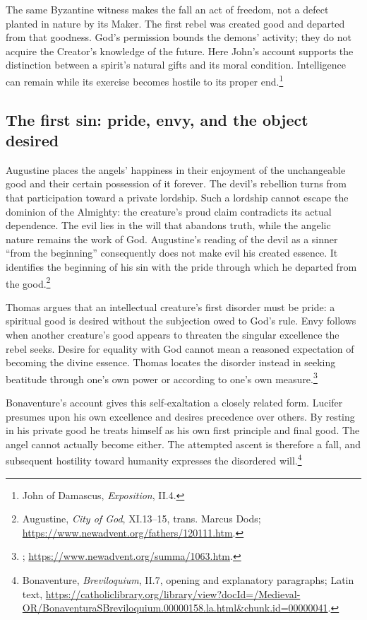 The same Byzantine witness makes the fall an act of freedom, not a defect
planted in nature by its Maker. The first rebel was created good and departed
from that goodness. God's permission bounds the demons' activity; they do
not acquire the Creator's knowledge of the future. Here John's account
supports the distinction between a spirit's natural gifts and its moral
condition. Intelligence can remain while its exercise becomes hostile to
its proper end.\footnote{John of Damascus, \emph{Exposition}, II.4.}

\subsection{The first sin: pride, envy, and the object desired}

Augustine places the angels' happiness in their enjoyment of the unchangeable
good and their certain possession of it forever. The devil's rebellion turns
from that participation toward a private lordship. Such a lordship cannot
escape the dominion of the Almighty: the creature's proud claim contradicts
its actual dependence. The evil lies in the will that abandons truth, while
the angelic nature remains the work of God. Augustine's reading of the devil
as a sinner ``from the beginning'' consequently does not make evil his
created essence. It identifies the beginning of his sin with the pride
through which he departed from the good.\footnote{Augustine, \emph{City of
God}, XI.13--15, trans. Marcus Dods;
\url{https://www.newadvent.org/fathers/120111.htm}.}

Thomas argues that an intellectual
creature's first disorder must be pride: a spiritual good is desired without
the subjection owed to God's rule. Envy follows when another creature's good
appears to threaten the singular excellence the rebel seeks. Desire for
equality with God cannot mean a reasoned expectation of becoming the divine
essence. Thomas locates the disorder instead in seeking beatitude through
one's own power or according to one's own measure.\footnote{; \url{https://www.newadvent.org/summa/1063.htm}.}

Bonaventure's account gives this self-exaltation a closely related form.
Lucifer presumes upon his own excellence and desires precedence over others.
By resting in his private good he treats himself as his own first principle
and final good. The angel cannot actually become either. The attempted
ascent is therefore a fall, and subsequent hostility toward humanity
expresses the disordered will.\footnote{Bonaventure,
\emph{Breviloquium}, II.7, opening and explanatory paragraphs; Latin text,
\url{https://catholiclibrary.org/library/view?docId=/Medieval-OR/BonaventuraSBreviloquium.00000158.la.html\&chunk.id=00000041}.}

